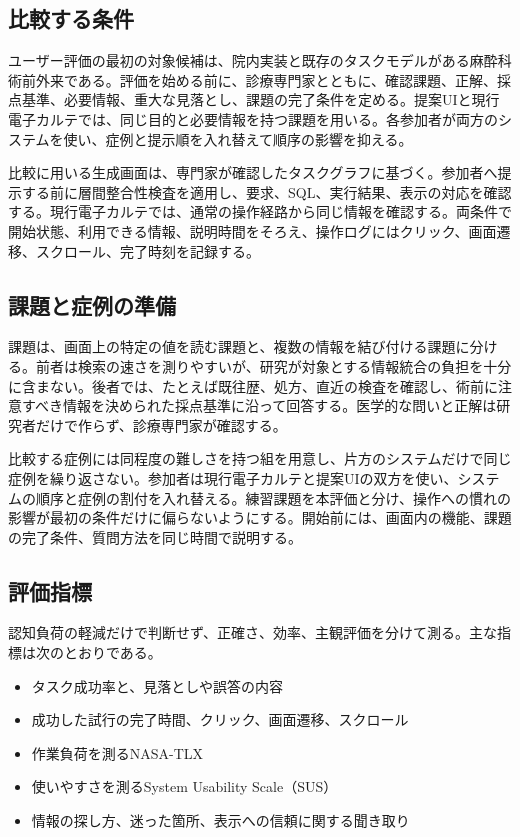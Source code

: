 \documentclass[a4paper]{jsarticle}
\begin{document}
\subsection{比較する条件}

ユーザー評価の最初の対象候補は、院内実装と既存のタスクモデルがある麻酔科術前外来である。評価を始める前に、診療専門家とともに、確認課題、正解、採点基準、必要情報、重大な見落とし、課題の完了条件を定める。提案UIと現行電子カルテでは、同じ目的と必要情報を持つ課題を用いる。各参加者が両方のシステムを使い、症例と提示順を入れ替えて順序の影響を抑える。

比較に用いる生成画面は、専門家が確認したタスクグラフに基づく。参加者へ提示する前に層間整合性検査を適用し、要求、SQL、実行結果、表示の対応を確認する。現行電子カルテでは、通常の操作経路から同じ情報を確認する。両条件で開始状態、利用できる情報、説明時間をそろえ、操作ログにはクリック、画面遷移、スクロール、完了時刻を記録する。

\subsection{課題と症例の準備}

課題は、画面上の特定の値を読む課題と、複数の情報を結び付ける課題に分ける。前者は検索の速さを測りやすいが、研究が対象とする情報統合の負担を十分に含まない。後者では、たとえば既往歴、処方、直近の検査を確認し、術前に注意すべき情報を決められた採点基準に沿って回答する。医学的な問いと正解は研究者だけで作らず、診療専門家が確認する。

比較する症例には同程度の難しさを持つ組を用意し、片方のシステムだけで同じ症例を繰り返さない。参加者は現行電子カルテと提案UIの双方を使い、システムの順序と症例の割付を入れ替える。練習課題を本評価と分け、操作への慣れの影響が最初の条件だけに偏らないようにする。開始前には、画面内の機能、課題の完了条件、質問方法を同じ時間で説明する。

\subsection{評価指標}

認知負荷の軽減だけで判断せず、正確さ、効率、主観評価を分けて測る。主な指標は次のとおりである。

\begin{itemize}
  \item タスク成功率と、見落としや誤答の内容
  \item 成功した試行の完了時間、クリック、画面遷移、スクロール
  \item 作業負荷を測るNASA-TLX
  \item 使いやすさを測るSystem Usability Scale（SUS）
  \item 情報の探し方、迷った箇所、表示への信頼に関する聞き取り
\end{itemize}
\end{document}
